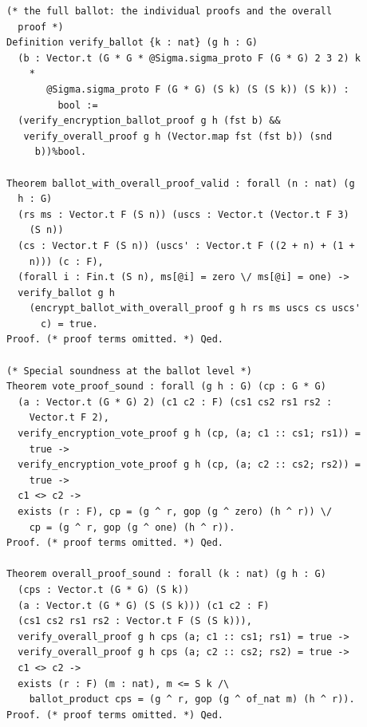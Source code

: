 \begin{lstlisting}[frame=single, language=Coq, caption={Frontend Functions},
  label={frontend_fun},captionpos=t, basicstyle=\ttfamily\scriptsize,
  abovecaptionskip=-\medskipamount]
(* the full ballot: the individual proofs and the overall
  proof *)
Definition verify_ballot {k : nat} (g h : G)
  (b : Vector.t (G * G * @Sigma.sigma_proto F (G * G) 2 3 2) k
    * 
       @Sigma.sigma_proto F (G * G) (S k) (S (S k)) (S k)) :
         bool :=
  (verify_encryption_ballot_proof g h (fst b) && 
   verify_overall_proof g h (Vector.map fst (fst b)) (snd
     b))%bool.

Theorem ballot_with_overall_proof_valid : forall (n : nat) (g
  h : G) 
  (rs ms : Vector.t F (S n)) (uscs : Vector.t (Vector.t F 3)
    (S n)) 
  (cs : Vector.t F (S n)) (uscs' : Vector.t F ((2 + n) + (1 +
    n))) (c : F),
  (forall i : Fin.t (S n), ms[@i] = zero \/ ms[@i] = one) ->
  verify_ballot g h 
    (encrypt_ballot_with_overall_proof g h rs ms uscs cs uscs'
      c) = true.
Proof. (* proof terms omitted. *) Qed.

(* Special soundness at the ballot level *)
Theorem vote_proof_sound : forall (g h : G) (cp : G * G)
  (a : Vector.t (G * G) 2) (c1 c2 : F) (cs1 cs2 rs1 rs2 :
    Vector.t F 2),
  verify_encryption_vote_proof g h (cp, (a; c1 :: cs1; rs1)) =
    true ->
  verify_encryption_vote_proof g h (cp, (a; c2 :: cs2; rs2)) =
    true ->
  c1 <> c2 ->
  exists (r : F), cp = (g ^ r, gop (g ^ zero) (h ^ r)) \/ 
    cp = (g ^ r, gop (g ^ one) (h ^ r)).
Proof. (* proof terms omitted. *) Qed.

Theorem overall_proof_sound : forall (k : nat) (g h : G) 
  (cps : Vector.t (G * G) (S k))
  (a : Vector.t (G * G) (S (S k))) (c1 c2 : F) 
  (cs1 cs2 rs1 rs2 : Vector.t F (S (S k))),
  verify_overall_proof g h cps (a; c1 :: cs1; rs1) = true ->
  verify_overall_proof g h cps (a; c2 :: cs2; rs2) = true ->
  c1 <> c2 ->
  exists (r : F) (m : nat), m <= S k /\ 
    ballot_product cps = (g ^ r, gop (g ^ of_nat m) (h ^ r)).
Proof. (* proof terms omitted. *) Qed.
\end{lstlisting}


